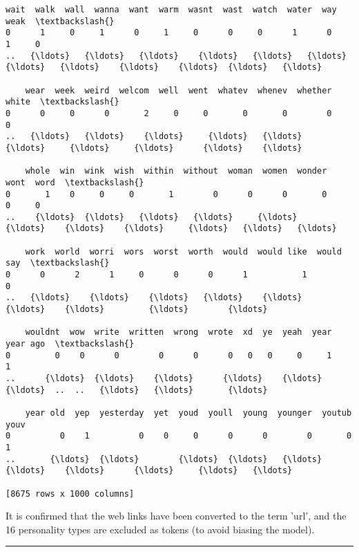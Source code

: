 \documentclass[11pt]{article}
\begin{document}
\begin{Verbatim}[commandchars=\\\{\}]
    wait  walk  wall  wanna  want  warm  wasnt  wast  watch  water  way  weak  \textbackslash{}
0      1     0     1      0     1     0      0     0      1      0    1     0   
..   {\ldots}   {\ldots}   {\ldots}    {\ldots}   {\ldots}   {\ldots}    {\ldots}   {\ldots}    {\ldots}    {\ldots}  {\ldots}   {\ldots}   

    wear  week  weird  welcom  well  went  whatev  whenev  whether  white  \textbackslash{}
0      0     0      0       2     0     0       0       0        0      0   
..   {\ldots}   {\ldots}    {\ldots}     {\ldots}   {\ldots}   {\ldots}     {\ldots}     {\ldots}      {\ldots}    {\ldots}   

    whole  win  wink  wish  within  without  woman  women  wonder  wont  word  \textbackslash{}
0       1    0     0     0       1        0      0      0       0     0     0   
..    {\ldots}  {\ldots}   {\ldots}   {\ldots}     {\ldots}      {\ldots}    {\ldots}    {\ldots}     {\ldots}   {\ldots}   {\ldots}   

    work  world  worri  wors  worst  worth  would  would like  would say  \textbackslash{}
0      0      2      1     0      0      0      1           1          0   
..   {\ldots}    {\ldots}    {\ldots}   {\ldots}    {\ldots}    {\ldots}    {\ldots}         {\ldots}        {\ldots}   

    wouldnt  wow  write  written  wrong  wrote  xd  ye  yeah  year  year ago  \textbackslash{}
0         0    0      0        0      0      0   0   0     0     1         1   
..      {\ldots}  {\ldots}    {\ldots}      {\ldots}    {\ldots}    {\ldots}  ..  ..   {\ldots}   {\ldots}       {\ldots}   

    year old  yep  yesterday  yet  youd  youll  young  younger  youtub  youv  
0          0    1          0    0     0      0      0        0       0     1  
..       {\ldots}  {\ldots}        {\ldots}  {\ldots}   {\ldots}    {\ldots}    {\ldots}      {\ldots}     {\ldots}   {\ldots}  

[8675 rows x 1000 columns]

    \end{Verbatim}

    It is confirmed that the web links have been converted to the term
'url', and the 16 personality types are excluded as tokens (to avoid
biasing the model).

    \begin{center}\rule{0.5\linewidth}{\linethickness}\end{center}
\end{document}

